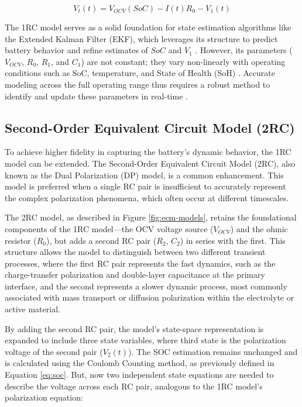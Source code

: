 \documentclass[lettersize,journal]{IEEEtran}
\begin{document}
\begin{equation}
	\label{eq:vt}
	V_t(t) = V_{OCV}(SoC) - I(t)R_0 - V_1(t)
\end{equation}

The 1RC model serves as a solid foundation for state estimation algorithms like the Extended Kalman Filter (EKF), which leverages its structure to predict battery behavior and refine estimates of $SoC$ and $V_1$ \cite{xie2023state, pai2023online}. However, its parameters ($V_{OCV}$, $R_0$, $R_1$, and $C_1$) are not constant; they vary non-linearly with operating conditions such as SoC, temperature, and State of Health (SoH) \cite{tran2021comprehensive}. Accurate modeling across the full operating range thus requires a robust method to identify and update these parameters in real-time \cite{yang2023improved, pai2023online}.

\subsection{Second-Order Equivalent Circuit Model (2RC)}

To achieve higher fidelity in capturing the battery's dynamic behavior, the 1RC model can be extended. The Second-Order Equivalent Circuit Model (2RC), also known as the Dual Polarization (DP) model, is a common enhancement\cite{tekin2024comparative, khalfi2021electric}. This model is preferred when a single RC pair is insufficient to accurately represent the complex polarization phenomena, which often occur at different timescales.

The 2RC model, as described in Figure \ref{fig:ecm-models}, retains the foundational components of the 1RC model—the OCV voltage source ($V_{OCV}$) and the ohmic resistor ($R_0$), but adds a second RC pair ($R_2$, $C_2$) in series with the first. This structure allows the model to distinguish between two different transient processes\cite{tran2021comprehensive}, where the first RC pair represents the fast dynamics, such as the charge-transfer polarization and double-layer capacitance at the primary interface, and the second represents a slower dynamic process, most commonly associated with mass transport or diffusion polarization within the electrolyte or active material.

By adding the second RC pair, the model's state-space representation is expanded to include three state variables, where third state is the polarization voltage of the second pair ($V_2(t)$). The SOC estimation remains unchanged and is calculated using the Coulomb Counting method, as previously defined in Equation \ref{eq:soc}. But, now two independent state equations are needed to describe the voltage across each RC pair, analogous to the 1RC model's polarization equation:
\end{document}
